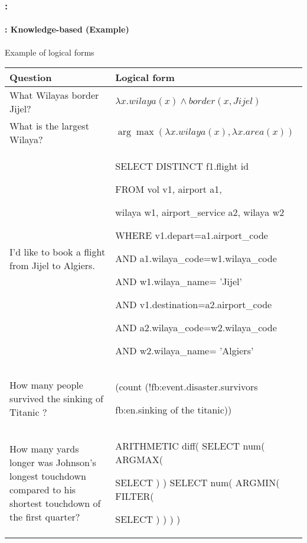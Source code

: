 \documentclass[xcolor=table]{beamer}
\begin{document}
\begin{frame}
	\frametitle{\insertshortsubtitle: \insertsection}
	\framesubtitle{\insertsubsection: Knowledge-based (Example)}
	
	\begin{exampleblock}{Example of logical forms \cite{2020-jurafsky-martin}}
		\centering\tiny\bfseries
		\begin{tabular}{p{}p{}}
			\hline\hline
			Question & Logical form \\
			\hline
			What Wilayas border Jijel? 
			& $\lambda x.wilaya(x) \wedge border(x, Jijel)$ \\
			
			What is the largest Wilaya? 
			& $\arg\max(\lambda x.wilaya(x), \lambda x.area(x))$ \\
			
			I'd like to book a flight from Jijel to Algiers. 
			& {\color{blue}SELECT DISTINCT} f1.flight id
			
			{\color{blue}FROM} vol v1, airport  a1,
			
			wilaya w1, airport\_service a2, wilaya w2
			
			{\color{blue}WHERE} v1.depart=a1.airport\_code
			
			{\color{blue}AND} a1.wilaya\_code=w1.wilaya\_code
			
			{\color{blue}AND} w1.wilaya\_name= '{\color{red}Jijel}'
			
			{\color{blue}AND} v1.destination=a2.airport\_code
			
			{\color{blue}AND} a2.wilaya\_code=w2.wilaya\_code
			
			{\color{blue}AND} w2.wilaya\_name= '{\color{red}Algiers}' \\
			
			
			How many people survived the sinking of Titanic ? 
			& (count (!fb:event.disaster.survivors
			
			fb:en.sinking of the titanic))\\
			
			How many yards longer was Johnson's longest touchdown compared to his shortest touchdown of the first quarter?
			& 
			ARITHMETIC diff( SELECT num( ARGMAX(
			
			SELECT ) ) SELECT num( ARGMIN( FILTER(
			
			SELECT ) ) ) )\\
			\hline\hline
		\end{tabular}
	\end{exampleblock}
	
\end{frame}
\end{document}
